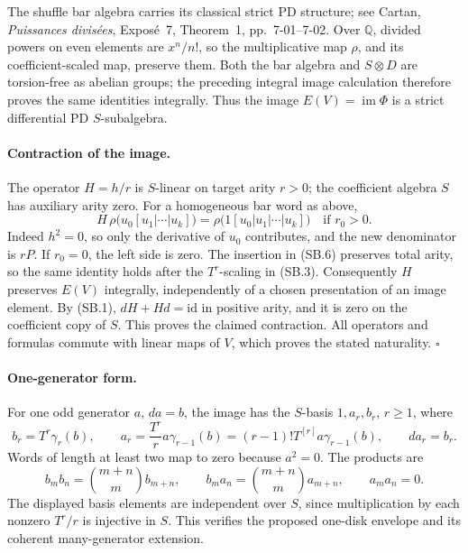 The shuffle bar algebra carries its classical strict PD structure;
see Cartan, \emph{Puissances divis\'ees}, Expos\'e~7,
Theorem~1, pp.~7-01--7-02. Over \(\mathbb Q\), divided powers on
even elements are \(x^n/n!\), so the multiplicative map \(\rho\),
and its coefficient-scaled map, preserve them.
Both the bar algebra and \(S\otimes D\) are torsion-free as abelian
groups; the preceding integral image calculation therefore proves
the same identities integrally. Thus the image \(E(V)=\operatorname{im}\Phi\)
is a strict differential PD \(S\)-subalgebra.

\paragraph{Contraction of the image.}
The operator \(H=h/r\) is \(S\)-linear on target arity \(r>0\);
the coefficient algebra \(S\) has auxiliary arity zero.
For a homogeneous bar word as above,
\[
 H\,\rho\bigl(u_0[u_1|\cdots|u_k]\bigr)
 =
 \rho\bigl(1[u_0|u_1|\cdots|u_k]\bigr)
 \quad\text{if }r_0>0.
 \tag{SB.6}
\]
Indeed \(h^2=0\), so only the derivative of \(u_0\) contributes,
and the new denominator is \(rP\). If \(r_0=0\), the left side
is zero. The insertion in (SB.6) preserves total arity, so the
same identity holds after the \(T^r\)-scaling in (SB.3).
Consequently \(H\) preserves \(E(V)\) integrally, independently of
a chosen presentation of an image element. By (SB.1),
\(dH+Hd=\mathrm{id}\) in positive arity, and it is zero on the
coefficient copy of \(S\). This proves the claimed contraction.
All operators and formulas commute with linear maps of \(V\),
which proves the stated naturality. \(\square\)

\paragraph{One-generator form.}
For one odd generator \(a\), \(da=b\), the image has the \(S\)-basis
\(1,a_r,b_r\), \(r\ge1\), where
\[
 b_r=T^r\gamma_r(b),\qquad
 a_r=\frac{T^r}{r}a\gamma_{r-1}(b)
     =(r-1)!T^{[r]}a\gamma_{r-1}(b),
 \qquad da_r=b_r.
\]
Words of length at least two map to zero because \(a^2=0\).
The products are
\[
 b_m b_n=\binom{m+n}{m}b_{m+n},\qquad
 b_m a_n=\binom{m+n}{m}a_{m+n},\qquad
 a_m a_n=0.
\]
The displayed basis elements are independent over \(S\), since
multiplication by each nonzero \(T^r/r\) is injective in \(S\).
This verifies the proposed one-disk envelope and its coherent
many-generator extension.

